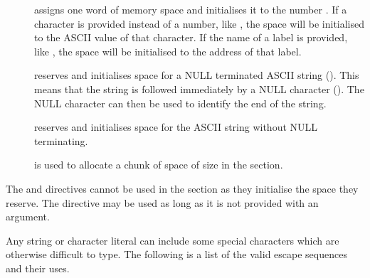 \begin{description}

\item[\word {}] assigns one word of memory space and initialises it to
the number .
If a character is provided instead of a number, like , the space
will be initialised to the ASCII value of that character.
If the name of a label is provided, like , the space will be
initialised to the address of that label.

\item[\asciiz {}] reserves and initialises space 
for a NULL terminated ASCII string ().
This means that the string is followed immediately by a NULL
character (). The NULL character can then be used
to identify the end of the string.

\item[\ascii {}] reserves and initialises space for 
the ASCII string  without NULL terminating.

\item[\Space {}] is used to allocate a chunk of space 
of size  in the \bss section.

\end{description}

The \ascii and \asciiz directives cannot be used in the \bss section
as they initialise the space they reserve. The \word directive may be
used as long as it is not provided with an argument.

Any string or character literal can include some special characters which
are otherwise difficult to type. The following is a list of the valid
escape sequences and their uses.

